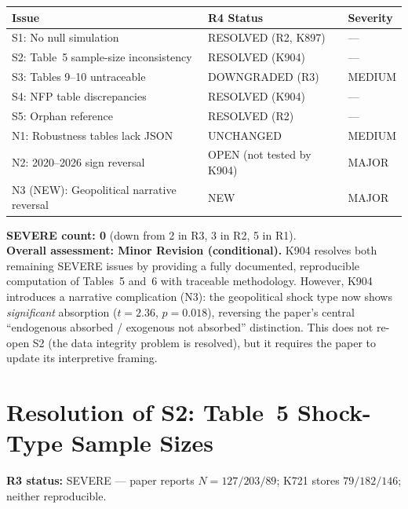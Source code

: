 \documentclass[12pt,a4paper]{article}
\begin{document}
\begin{tabular}{lll}
\toprule
\textbf{Issue} & \textbf{R4 Status} & \textbf{Severity} \\
\midrule
S1: No null simulation        & \textcolor{okgreen}{RESOLVED (R2, K897)} & --- \\
S2: Table~5 sample-size inconsistency & \textcolor{okgreen}{RESOLVED (K904)} & --- \\
S3: Tables 9--10 untraceable  & \textcolor{resolved}{DOWNGRADED (R3)} & MEDIUM \\
S4: NFP table discrepancies   & \textcolor{okgreen}{RESOLVED (K904)} & --- \\
S5: Orphan reference          & \textcolor{okgreen}{RESOLVED (R2)} & --- \\
\addlinespace
N1: Robustness tables lack JSON & \textcolor{warncolor}{UNCHANGED} & MEDIUM \\
N2: 2020--2026 sign reversal    & \textcolor{warncolor}{OPEN (not tested by K904)} & MAJOR \\
N3 (NEW): Geopolitical narrative reversal & \textcolor{warncolor}{NEW} & MAJOR \\
\bottomrule
\end{tabular}

\medskip

\noindent\textbf{SEVERE count: 0} (down from 2 in R3, 3 in R2, 5 in R1).\\[0.3em]
\textbf{Overall assessment: Minor Revision (conditional).}
K904 resolves both remaining SEVERE issues by providing a fully documented, reproducible computation of Tables~5 and~6 with traceable methodology.
However, K904 introduces a narrative complication (N3): the geopolitical shock type now shows \textit{significant} absorption ($t = 2.36$, $p = 0.018$), reversing the paper's central ``endogenous absorbed / exogenous not absorbed'' distinction.
This does not re-open S2 (the data integrity problem is resolved), but it requires the paper to update its interpretive framing.

\bigskip

\section*{Resolution of S2: Table~5 Shock-Type Sample Sizes}

\textbf{R3 status:} SEVERE --- paper reports $N = 127 / 203 / 89$; K721 stores $79 / 182 / 146$; neither reproducible.
\end{document}
